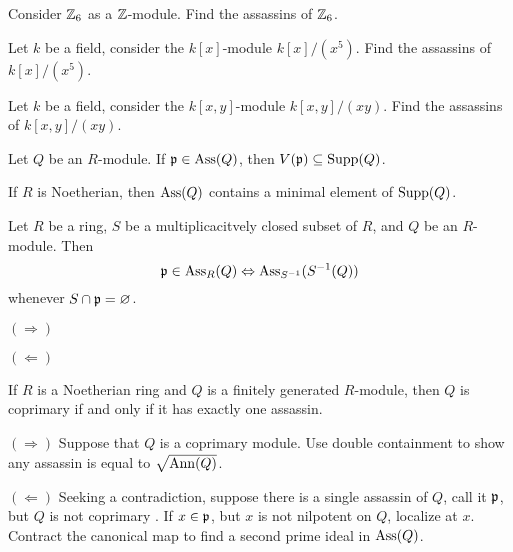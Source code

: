 \documentclass{ximera}
\begin{document}
\begin{exercise}
  Consider $\mathbb Z_6$ as a $\mathbb Z$-module. Find the assassins of $\mathbb Z_6$.
\end{exercise}

\begin{exercise}
  Let $k$ be a field, consider the $k[x]$-module $k[x]/(x^5)$. Find
  the assassins of $k[x]/(x^5)$.
\end{exercise}

\begin{exercise}
  Let $k$ be a field, consider the $k[x,y]$-module $k[x,y]/(xy)$. Find
  the assassins of $k[x,y]/(xy)$.
\end{exercise}


\begin{proposition}
  Let $Q$ be an $R$-module. If $\mathfrak{p}\in\operatorname{Ass}(Q)$, then $V(\mathfrak{p})\subseteq
  \operatorname{Supp}(Q)$.
\end{proposition}

\begin{proposition}
  If $R$ is Noetherian, then $\operatorname{Ass}(Q)$ contains a minimal element of
  $\operatorname{Supp}(Q)$.
\end{proposition}




\begin{proposition}
  Let $R$ be a ring, $S$ be a multiplicacitvely closed subset of $R$,
  and $Q$ be an $R$-module. Then
  \[
  \mathfrak{p} \in \operatorname{Ass}_R(Q) \Leftrightarrow \operatorname{Ass}_{S^{-1}}(S^{-1}(Q))
  \]
  whenever $S\cap\mathfrak{p} = \varnothing$.
  \begin{sketch}
    $(\Rightarrow)$

    $(\Leftarrow)$
  \end{sketch}
\end{proposition}


\begin{lemma}
  If $R$ is a Noetherian ring and $Q$ is a finitely generated
  $R$-module, then $Q$ is coprimary if and only if it has exactly one
  assassin.
  \begin{sketch} 
    $(\Rightarrow)$ Suppose that $Q$ is a coprimary module. Use double
    containment to show any assassin is equal to $\sqrt{\operatorname{Ann}(Q)}$.

    
    $(\Leftarrow)$ Seeking a contradiction, suppose there is a single
    assassin of $Q$, call it $\mathfrak{p}$, but $Q$ is not coprimary . If $x\in
    \mathfrak{p}$, but $x$ is not nilpotent on $Q$, localize at $x$. Contract
    the canonical map to find a second prime ideal in $\operatorname{Ass}(Q)$.
  \end{sketch}
\end{lemma}
\end{document}
